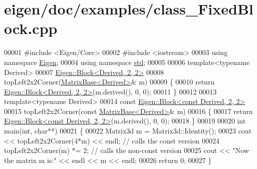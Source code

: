 \hypertarget{eigen_2doc_2examples_2class___fixed_block_8cpp_source}{}\section{eigen/doc/examples/class\+\_\+\+Fixed\+Block.cpp}
\label{eigen_2doc_2examples_2class___fixed_block_8cpp_source}

\begin{DoxyCode}
00001 \textcolor{preprocessor}{#include <Eigen/Core>}
00002 \textcolor{preprocessor}{#include <iostream>}
00003 \textcolor{keyword}{using namespace }\hyperlink{namespace_eigen}{Eigen};
00004 \textcolor{keyword}{using namespace }\hyperlink{namespacestd}{std};
00005 
00006 \textcolor{keyword}{template}<\textcolor{keyword}{typename} Derived>
00007 \hyperlink{group___core___module_class_eigen_1_1_block}{Eigen::Block<Derived, 2, 2>}
00008 topLeft2x2Corner(\hyperlink{group___core___module_class_eigen_1_1_matrix_base}{MatrixBase<Derived>}& m)
00009 \{
00010   \textcolor{keywordflow}{return} \hyperlink{group___core___module_class_eigen_1_1_block}{Eigen::Block<Derived, 2, 2>}(m.derived(), 0, 0);
00011 \}
00012 
00013 \textcolor{keyword}{template}<\textcolor{keyword}{typename} Derived>
00014 \textcolor{keyword}{const} \hyperlink{group___core___module_class_eigen_1_1_block}{Eigen::Block<const Derived, 2, 2>}
00015 topLeft2x2Corner(\textcolor{keyword}{const} \hyperlink{group___core___module_class_eigen_1_1_matrix_base}{MatrixBase<Derived>}& m)
00016 \{
00017   \textcolor{keywordflow}{return} \hyperlink{group___core___module_class_eigen_1_1_block}{Eigen::Block<const Derived, 2, 2>}(m.derived(), 0, 0);
00018 \}
00019 
00020 \textcolor{keywordtype}{int} main(\textcolor{keywordtype}{int}, \textcolor{keywordtype}{char}**)
00021 \{
00022   Matrix3d m = Matrix3d::Identity();
00023   cout << topLeft2x2Corner(4*m) << endl; \textcolor{comment}{// calls the const version}
00024   topLeft2x2Corner(m) *= 2;              \textcolor{comment}{// calls the non-const version}
00025   cout << \textcolor{stringliteral}{"Now the matrix m is:"} << endl << m << endl;
00026   \textcolor{keywordflow}{return} 0;
00027 \}
\end{DoxyCode}
